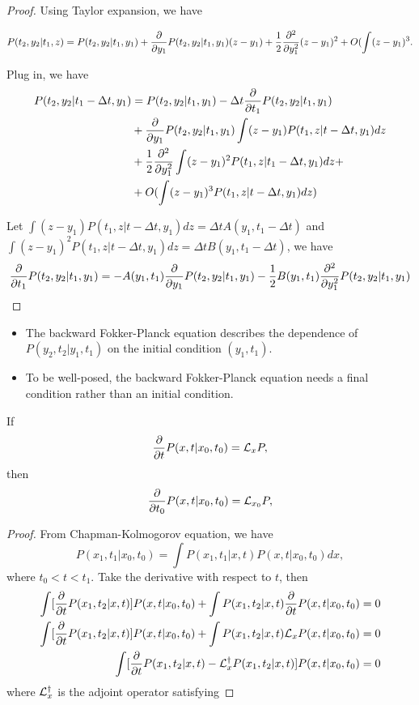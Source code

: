 \begin{refsection}
\begin{proof}
	Using Taylor expansion, we have
	
	$$P(t_2,y_2|t_1,z) = P(t_2,y_2|t_1,y_1)+\frac{\partial}{\partial y_1}P(t_2,y_2|t_1,y_1) (z-y_1) +\frac{1}{2}\frac{\partial^2}{\partial y_1^2} (z-y_1)^2 + O(\int(z-y_1)^3. $$
	
	Plug in, we have
	\begin{align*}
	P(t_2,y_2|t_1-\Delta t,y_1) &= P(t_2,y_2|t_1,y_1) - \Delta t \frac{\partial}{\partial t_1}P(t_2,y_2|t_1,y_1)\\
	&+ \frac{\partial}{\partial y_1}P(t_2,y_2|t_1,y_1)\int (z-y_1)P(t_1,z|t-\Delta t,y_1)dz\\
	&+\frac{1}{2}\frac{\partial^2}{\partial y_1^2}\int(z-y_1)^2P(t_1,z|t_1-\Delta t,y_1)dz + \\
	&+O(\int(z-y_1)^3P(t_1,z|t-\Delta t,y_1)dz)
	\end{align*}
	
	
	Let $\int (z-y_1)P(t_1,z|t-\Delta t,y_1)dz = \Delta t A(y_1,t_1-\Delta t)$ and $\int (z-y_1)^2P(t_1,z|t-\Delta t,y_1)dz = \Delta t B(y_1,t_1-\Delta t)$, we have
	$$\frac{\partial}{\partial t_1}P(t_2,y_2|t_1,y_1) = - A(y_1,t_1)\frac{\partial}{\partial y_1}P(t_2,y_2|t_1,y_1) - \frac{1}{2}B(y_1,t_1)\frac{\partial^2}{\partial y_1^2} P(t_2,y_2|t_1,y_1)$$ 
\end{proof}

\begin{remark}[interpretation]\hfill
\begin{itemize}
	\item The backward Fokker-Planck equation describes the dependence of $P(y_2,t_2|y_1,t_1)$ on the initial condition $(y_1,t_1)$.
	\item To be well-posed, the backward Fokker-Planck equation needs a final condition rather than an initial condition.	
\end{itemize}
\end{remark}


\begin{lemma}
If 
$$\frac{\partial }{\partial t} P(x,t|x_0,t_0) = \mathcal{L}_x P,$$
then
$$\frac{\partial }{\partial t_0} P(x,t|x_0,t_0) = \mathcal{L}_{x_0} P,$$
\end{lemma}
\begin{proof}
From Chapman-Kolmogorov equation, we have
$$P(x_1,t_1|x_0,t_0) = \int P(x_1,t_1|x,t)P(x,t|x_0,t_0)dx,$$
where $t_0 < t < t_1$. Take the derivative with respect to $t$, then
\begin{align*}
\int [\frac{\partial}{\partial t}P(x_1,t_2|x,t)]P(x,t|x_0,t_0) + \int P(x_1,t_2|x,t)\frac{\partial}{\partial t}P(x,t|x_0,t_0) = 0\\
\int [\frac{\partial}{\partial t}P(x_1,t_2|x,t)]P(x,t|x_0,t_0) + \int P(x_1,t_2|x,t)\mathcal{L}_{x}P(x,t|x_0,t_0) = 0\\
\int [\frac{\partial}{\partial t}P(x_1,t_2|x,t) - \mathcal{L}_{x}^\dagger P(x_1,t_2|x,t)]P(x,t|x_0,t_0) = 0
\end{align*}
where $\mathcal{L}^\dagger_x$ is the adjoint operator satisfying


\end{proof}
\end{refsection}
